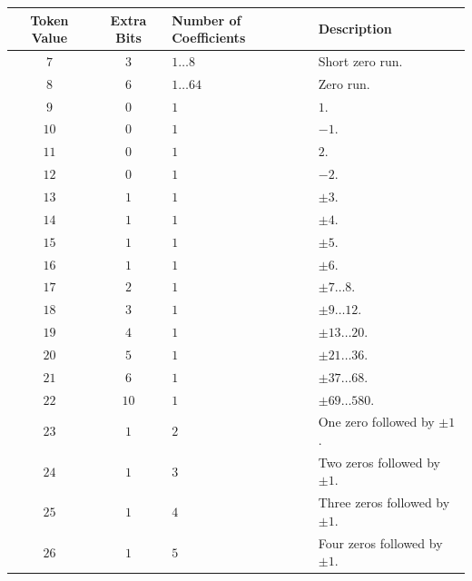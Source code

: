 \documentclass[9pt,letterpaper]{book}
\numberwithin{equation}{chapter}
\numberwithin{figure}{chapter}
\numberwithin{table}{chapter}
\begin{document}
\begin{table}[htbp]
\begin{center}
\begin{tabularx}{\textwidth}{cclX}\toprule
Token Value  & Extra Bits & \multicolumn{1}{p{55pt}}{Number of Coefficients}
                                    & Description                    \\\midrule
$7$          & $3$  & $1\ldots 8$   & Short zero run.                \\
$8$          & $6$  & $1\ldots 64$  & Zero run.                      \\
$9$          & $0$  & $1$           & $1$.                           \\
$10$         & $0$  & $1$           & $-1$.                          \\
$11$         & $0$  & $1$           & $2$.                           \\
$12$         & $0$  & $1$           & $-2$.                          \\
$13$         & $1$  & $1$           & $\pm 3$.                       \\
$14$         & $1$  & $1$           & $\pm 4$.                       \\
$15$         & $1$  & $1$           & $\pm 5$.                       \\
$16$         & $1$  & $1$           & $\pm 6$.                       \\
$17$         & $2$  & $1$           & $\pm 7\ldots 8$.               \\
$18$         & $3$  & $1$           & $\pm 9\ldots 12$.              \\
$19$         & $4$  & $1$           & $\pm 13\ldots 20$.             \\
$20$         & $5$  & $1$           & $\pm 21\ldots 36$.             \\
$21$         & $6$  & $1$           & $\pm 37\ldots 68$.             \\
$22$         & $10$ & $1$           & $\pm 69\ldots 580$.            \\
$23$         & $1$  & $2$           & One zero followed by $\pm 1$.  \\
$24$         & $1$  & $3$           & Two zeros followed by $\pm 1$. \\
$25$         & $1$  & $4$           & Three zeros followed by
 $\pm 1$. \\
$26$         & $1$  & $5$           & Four zeros followed by
 $\pm 1$. \\

\end{tabularx}
\end{center}
\end{table}
\end{document}
